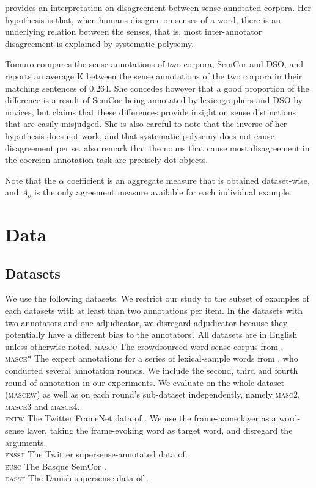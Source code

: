 \documentclass[11pt,a4paper]{article}
\begin{document}
\cite{Tomuro2001a} provides an interpretation on disagreement between sense-annotated corpora. Her hypothesis is that, when humans disagree on senses of a word, there is an underlying relation between the senses, that is, most inter-annotator disagreement is explained by systematic polysemy. 

Tomuro compares the sense annotations of two corpora, SemCor and DSO, and reports an average K between the sense annotations of the two corpora in their matching sentences of 0.264. She concedes however that a good proportion of the difference is a result of SemCor being annotated by lexicographers and DSO by novices, but claims that these differences provide insight on sense distinctions that are easily misjudged. She is also careful to note that the inverse of her hypothesis does not work, and that systematic polysemy does not cause disagreement per se.  \cite{Jezek2010} also remark that the nouns that cause most disagreement in the coercion annotation task are precisely dot objects.

Note that the $\alpha$ coefficient is an aggregate measure that is obtained dataset-wise, and $A_o$ is the only agreement measure available for each individual example.

\section{Data}
\subsection{Datasets}
We use the following datasets. We restrict our study to the subset of examples of each datasets with at least than two annotations per item. In the datasets with two annotators and one adjudicator, we disregard adjudicator because they potentially have a different bias to the annotators'. All datasets are in English unless otherwise noted.
\noindent\textsc{mascc} The crowdsourced word-sense corpus from \cite{Passenau2010}.\\
\textsc{masce*} The expert annotations for a series of lexical-sample words from \cite{Passonneau2012}, who conducted several annotation rounds. We include the second, third and fourth round of annotation in our experiments. We evaluate on the whole dataset (\textsc{mascew}) as well as on each round's sub-dataset independently, namely \textsc{masc2}, \textsc{masce3} and \textsc{masce4}.\\
\textsc{fntw} The Twitter FrameNet data of \cite{Sogaard2015}. We use the frame-name layer as a word-sense layer, taking the frame-evoking word as target word, and disregard the arguments.\\
\textsc{ensst} The Twitter supersense-annotated data of .\\
\textsc{eusc} The Basque SemCor \cite{Agirre2006}.\\
\textsc{dasst} The Danish supersense data of \cite{MartinezAlonso2015}.\\
\end{document}
